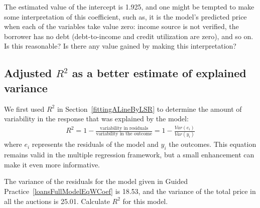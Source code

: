 \begin{exercisewrap}
\begin{nexercise}
The estimated value of the intercept is 1.925, and one might
be tempted to make some interpretation of this coefficient,
such as, it is the model's predicted price when each of the
variables take value zero: income source is not verified,
the borrower has no debt (debt-to-income and credit
utilization are zero), and so on.
Is this reasonable?
Is there any value gained by making this
interpretation?\footnotemark
\end{nexercise}
\end{exercisewrap}


\subsection{Adjusted $R^2$ as a better estimate
    of explained variance}


We first used $R^2$ in Section~\ref{fittingALineByLSR}
to determine the amount of variability in the response
that was explained by the model:
\begin{align*}
R^2 =
    1 - \frac{\text{variability in residuals}}
        {\text{variability in the outcome}}
	= 1 - \frac{Var(e_i)}{Var(y_i)}
\end{align*}
where $e_i$ represents the residuals of the model and
$y_i$ the outcomes.
This equation remains valid in the multiple regression
framework, but a small enhancement can make it even
more informative.

\begin{exercisewrap}
\begin{nexercise}
\label{computeUnadjR2ForFullLoansModel}%
The variance of the residuals for the model given in
Guided Practice~\ref{loansFullModelEqWCoef}
is 18.53, and the variance of the total price in all
the auctions is 25.01.
Calculate $R^2$ for this model.\footnotemark
\end{nexercise}
\end{exercisewrap}

